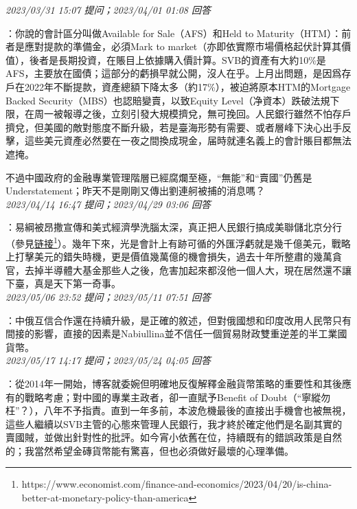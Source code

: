 \documentclass[twocolumn]{ctexart}
\begin{document}
\textit{\hfill\noindent\small 2023/03/31 15:07 提问；2023/04/01 01:08 回答}

：你說的會計區分叫做Available for Sale（AFS）和Held to Maturity（HTM）：前者是應對提款的準備金，必須Mark to market（亦即依實際市場價格起伏計算其價值），後者是長期投資，在賬目上依據購入價計算。SVB的資產有大約10\%是AFS，主要放在國債；這部分的虧損早就公開，沒人在乎。上月出問題，是因爲存戶在2022年不斷提款，資產總額下降太多（約17\%），被迫將原本HTM的Mortgage Backed Security（MBS）也認賠變賣，以致Equity Level（净資本）跌破法規下限，在周一被報導之後，立刻引發大規模擠兌，無可挽回。人民銀行雖然不怕存戶擠兌，但美國的敵對態度不斷升級，若是臺海形勢有需要、或者層峰下決心出手反擊，這些美元資產必然要在一夜之間換成現金，届時就連名義上的會計賬目都無法遮掩。

不過中國政府的金融專業管理階層已經腐爛至極，“無能”和“賣國”仍舊是Understatement；昨天不是剛剛又傳出劉連舸被捕的消息嗎？
\\

\textit{\hfill\noindent\small 2023/04/14 16:47 提问；2023/04/29 03:06 回答}

：易綱被昂撒宣傳和美式經濟學洗腦太深，真正把人民銀行搞成美聯儲北京分行（參見\href{https://www.economist.com/finance-and-economics/2023/04/20/is-china-better-at-monetary-policy-than-america}{链接\footnote{\url{https://www.economist.com/finance-and-economics/2023/04/20/is-china-better-at-monetary-policy-than-america}}}）。幾年下來，光是會計上有跡可循的外匯浮虧就是幾千億美元，戰略上打擊美元的錯失時機，更是價值幾萬億的機會損失，過去十年所整肅的幾萬貪官，去掉半導體大基金那些人之後，危害加起來都沒他一個人大，現在居然還不讓下臺，真是天下第一奇事。
\\

\textit{\hfill\noindent\small 2023/05/06 23:52 提问；2023/05/11 07:51 回答}

：中俄互信合作還在持續升級，是正確的敘述，但對俄國想和印度改用人民幣只有間接的影響，直接的因素是Nabiullina並不信任一個貿易財政雙重逆差的半工業國貨幣。
\\

\textit{\hfill\noindent\small 2023/05/17 14:17 提问；2023/05/24 04:05 回答}

：從2014年一開始，博客就委婉但明確地反復解釋金融貨幣策略的重要性和其後應有的戰略考慮；對中國的專業主政者，卻一直賦予Benefit of Doubt（“寧縱勿枉”？），八年不予指責。直到一年多前，本波危機最後的直接出手機會也被無視，這些人繼續以SVB主管的心態來管理人民銀行，我才終於確定他們是名副其實的賣國賊，並做出針對性的批評。如今宵小依舊在位，持續既有的錯誤政策是自然的；我當然希望金磚貨幣能有驚喜，但也必須做好最壞的心理準備。
\\
\end{document}
